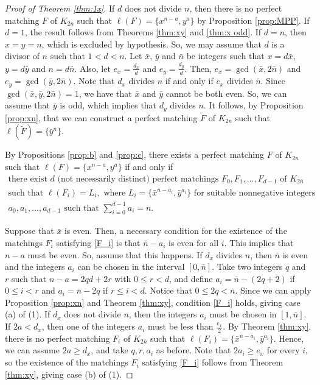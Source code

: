 \documentclass{amsart}
\theoremstyle{definition}
\numberwithin{equation}{section}
\begin{document}
\begin{proof}[Proof of Theorem \ref{thm:1x}]
If $d$ does not divide $n$, then there is no  perfect matching $F$ of $K_{2n}$ such that $\ell(F)=\{ x^{n-a}, y^a\}$ by Proposition \ref{prop:MPP}.
If $d=1$, the result follows from Theorems \ref{thm:xy} and \ref{thm:x odd}.
If $d=n$, then $x=y=n$, which is excluded by hypothesis. So, we may assume that $d$ is a divisor of $n$ 
such that $1<d<n$.
Let $\bar x$, $\bar y$ and $\bar n$ be integers such that $x=d\bar x$, $y=d\bar y$ and $n=d\bar n$.
Also, let $e_x=\frac{d_x}{d}$ and $e_y=\frac{d_y}{d}$.
Then, $e_x = \gcd(\bar x, 2\bar n)$ and $e_y = \gcd(\bar y, 2\bar n)$.
Note that $d_x$ divides $n$ if and only if $e_x$ divides $\bar n$.
Since $\gcd(\bar x, \bar y , 2\bar n)=1$, we have that $\bar x$ and $\bar y$ cannot be both even.
So, we can assume that $\bar y$ is odd, which implies that $d_y$ divides $n$.
It follows, by Proposition \ref{prop:xn}, that we can construct a perfect matching $\tilde F$ of $K_{2\bar n}$ such that
$\ell(\tilde F)=\{{\bar y}^{\bar n} \}$. 

By Propositions \ref{prop:b} and \ref{prop:c}, there exists a perfect matching $F$ of $K_{2n}$ such that $\ell(F)=\{ x^{n-a}, y^a\}$
if and only if 
\begin{equation}\label{F_i}
\begin{array}{l}
\textrm{there exist $d$ (not necessarily distinct) perfect matchings } F_0,F_1,\ldots, F_{d-1} \textrm{ of $K_{2\bar n}$} \\
\textrm{such that } \ell(F_i)=L_i, \textrm{ where } L_i=\{\bar x^{\bar n- a_i}, \bar y^{a_i}\} \textrm{ for suitable nonnegative integers}\\
a_0,a_1,\ldots,a_{d-1} \textrm{ such that $\sum\limits_{i=0}^{d-1} a_i=n$. }
\end{array}
\end{equation}

Suppose that $\bar x$ is even. Then, a necessary condition for the existence of the matchings $F_i$ satisfying \eqref{F_i}
is that $\bar n-a_i$ is even for all $i$. This implies that $n-a$ must be even.
So, assume that this happens. If $d_x$ divides $n$, then $\bar n$ is even and the integers $a_i$ can be chosen in the interval $[0,\bar n]$.
Take two integers $q$ and $r$ such that $n-a= 2qd + 2r $ with $0\leq r< d$, and define
$a_i=\bar n-(2q+2)$ if $0\leq i < r$ and $a_{i}=\bar n- 2q$  if $r\leq i< d$.
Notice that $0\leq 2q < \bar n$.
Since we can apply  Proposition \ref{prop:xn} and Theorem \ref{thm:xy}, condition \eqref{F_i} holds, giving case (a) of (1).
If $d_x$ does not divide $n$, then the integers $a_i$ must be chosen in  $[1,\bar n]$. 
If $2a<d_x$, then one of the integers $a_i$ must be less than $\frac{e_x}{2}$.
By Theorem \ref{thm:xy}, there is no perfect matching $F_i$ of $K_{2\bar n}$ such that 
$\ell(F_i)=\{ \bar x^{\bar n-a_i}, {\bar y}^{a_i}\}$.
Hence, we can assume $2a\geq d_x$, and take $q,r,a_i$ as before.
Note that $2a_i\geq e_x$ for every $i$, so the existence of the matchings $F_i$ satisfying \eqref{F_i} follows from Theorem \ref{thm:xy}, giving case (b) of (1).





\end{proof}
\end{document}
